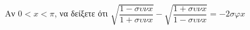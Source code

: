 \documentclass{presentation}
\begin{document}
\begin{askisi}
  Αν $0<x<π$, να δείξετε ότι $\sqrt{\dfrac{1-συνx}{1+συνx}}-\sqrt{\dfrac{1+συνx}{1-συνx}}=-2σφx$
\end{askisi}

\moodle

\end{document}
